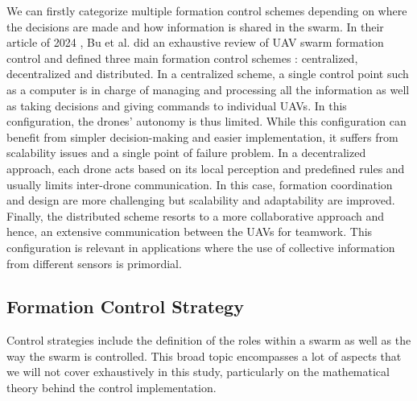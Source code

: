 We can firstly categorize multiple formation control schemes depending on where the decisions are made and how information is shared in the swarm. In their article of 2024 \parencite{bu_2024}, Bu et al. did an exhaustive review of UAV swarm formation control and defined three main formation control schemes : centralized, decentralized and distributed. In a centralized scheme, a single control point such as a computer is in charge of managing and processing all the information as well as taking decisions and giving commands to individual UAVs. In this configuration, the drones' autonomy is thus limited. While this configuration can benefit from simpler decision-making and easier implementation, it suffers from scalability issues and a single point of failure problem. In a decentralized approach, each drone acts based on its local perception and predefined rules and usually limits inter-drone communication. In this case, formation coordination and design are more challenging but scalability and adaptability are improved. Finally, the distributed scheme resorts to a more collaborative approach and hence, an extensive communication between the UAVs for teamwork. This configuration is relevant in applications where the use of collective information from different sensors is primordial.



\subsection{Formation Control Strategy}

Control strategies include the definition of the roles within a swarm as well as the way the swarm is controlled. This broad topic encompasses a lot of aspects that we will not cover exhaustively in this study, particularly on the mathematical theory behind the control implementation.


